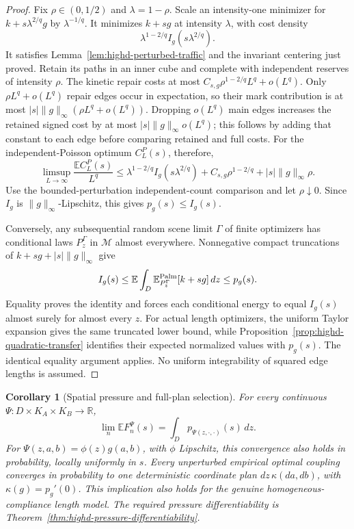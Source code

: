 \documentclass[11pt,reqno]{amsart}
\newtheorem{corollary}[theorem]{Corollary}
\theoremstyle{definition}
\theoremstyle{remark}
\numberwithin{equation}{section}
\newcommand{\R}{\mathbb R}
\newcommand{\E}{\mathbb E}
\begin{document}
\begin{proof}
Fix \(\rho\in(0,1/2)\) and \(\lambda=1-\rho\).
Scale an intensity-one minimizer for
\(k+s\lambda^{2/q}g\) by \(\lambda^{-1/q}\).
It minimizes \(k+s g\) at intensity \(\lambda\), with cost
density
\[
\lambda^{1-2/q}I_g(s\lambda^{2/q}).
\]
It satisfies Lemma~\ref{lem:highd-perturbed-traffic} and the
invariant centering just proved. Retain its paths in an inner
cube and complete with independent reserves of intensity \(\rho\).
The kinetic repair costs at most
\(C_{s,g}\rho^{1-2/q}L^q+o(L^q)\).
Only \(\rho L^q+o(L^q)\) repair edges occur in expectation, so
their mark contribution is at most
\(|s|\|g\|_\infty(\rho L^q+o(L^q))\).
Dropping \(o(L^q)\) main edges increases the retained signed cost
by at most \(|s|\|g\|_\infty o(L^q)\); this follows by adding
that constant to each edge before comparing retained and full costs.
For the independent-Poisson optimum \(C_L^P(s)\), therefore,
\[
\limsup_{L\to\infty}\frac{\E C_L^P(s)}{L^q}
 \le\lambda^{1-2/q}I_g(s\lambda^{2/q})
          +C_{s,g}\rho^{1-2/q}+|s|\|g\|_\infty\rho.
\]
Use the bounded-perturbation independent-count comparison and let
\(\rho\downarrow0\). Since \(I_g\) is
\(\|g\|_\infty\)-Lipschitz, this gives \(p_g(s)\le I_g(s)\).

Conversely, any subsequential random scene limit \(\Gamma\) of
finite optimizers has conditional laws \(P_z^\Gamma\) in
\(\mathcal M\) almost everywhere. Nonnegative compact truncations
of \(k+s g+|s|\|g\|_\infty\) give
\[
I_g(s)\le
\E\int_D\E_{P_z^\Gamma}^{\rm Palm}[k+s g]\,dz
\le p_g(s).
\]
Equality proves the identity and forces each conditional energy to
equal \(I_g(s)\) almost surely for almost every \(z\).
For actual length optimizers, the uniform Taylor expansion gives
the same truncated lower bound, while
Proposition~\ref{prop:highd-quadratic-transfer} identifies their
expected normalized values with \(p_g(s)\). The identical equality
argument applies. No uniform integrability of squared edge lengths
is assumed.
\end{proof}

\begin{corollary}[Spatial pressure and full-plan selection]
\label{cor:highd-spatial-pressure}
For every continuous \(\Psi:D\times K_A\times K_B\to\R\),
\[
\lim_n\E F_n^\Psi(s)
 =\int_D p_{\Psi(z,\cdot,\cdot)}(s)\,dz.
\]
For \(\Psi(z,a,b)=\phi(z)g(a,b)\), with \(\phi\) Lipschitz,
this convergence also holds in probability, locally uniformly in
\(s\). Every unperturbed empirical optimal coupling
converges in probability to one deterministic coordinate plan
\(dz\,\kappa(da,db)\), with \(\kappa(g)=p_g'(0)\).
This implication also holds for the genuine homogeneous-compliance
length model. The required pressure differentiability is
Theorem~\ref{thm:highd-pressure-differentiability}.
\end{corollary}
\end{document}
